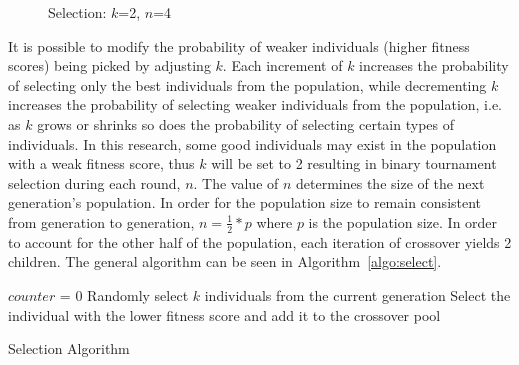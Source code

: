 \documentclass[12pt]{article} %
\begin{document}
\begin{figure}[H]
\caption{Selection: $k$=2, $n$=4}
\label{fig:selection_ex}
\end{figure}

It is possible to modify the probability of weaker individuals (higher fitness scores) being picked by adjusting $k$. Each increment of $k$ increases the probability of selecting only the best individuals from the population, while decrementing $k$ increases the probability of selecting weaker individuals from the population, i.e. as $k$ grows or shrinks so does the probability of selecting certain types of individuals.  In this research, some good individuals may exist in the population with a weak fitness score, thus $k$ will be set to 2 resulting in binary tournament selection during each round, $n$. The value of $n$ determines the size of the next generation's population. In order for the population size to remain consistent from generation to generation, $n = \frac{1}{2} * p$ where $p$ is the population size. In order to account for the other half of the population, each iteration of crossover yields 2 children. The general algorithm can be seen in Algorithm~\ref{algo:select}.

\begin{algorithm}[H]
$counter$ = 0\;
 {
	Randomly select $k$ individuals from the current generation\;
	Select the individual with the lower fitness score and add it to the crossover pool\;
}
 \caption{Selection Algorithm}
\label{algo:select}
\end{algorithm}

\end{document}
